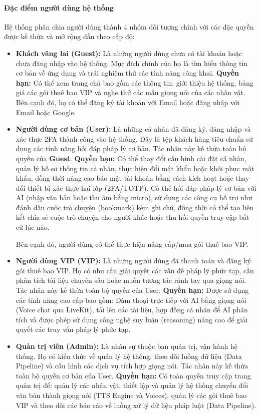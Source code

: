 \paragraph{Đặc điểm người dùng hệ thống}

Hệ thống phân chia người dùng
thành 4 nhóm đối tượng chính
với các đặc quyền được kế thừa
và mở rộng dần theo cấp độ:

\begin{itemize}

\item \textbf{Khách vãng lai (Guest):}
Là những người dùng chưa có tài khoản
hoặc chưa đăng nhập vào hệ thống.
Mục đích chính của họ
là tìm hiểu thông tin cơ bản về ứng dụng
và trải nghiệm thử các tính năng công khai.
\textbf{Quyền hạn:}
Có thể xem trang chủ bao gồm các thông tin:
giới thiệu hệ thống, bảng giá các gói thuê bao VIP
và nghe thử các mẫu giọng nói của các nhân vật.
Bên cạnh đó, họ có thể đăng ký tài khoản với Email
hoặc đăng nhập với Email hoặc Google.

\item \textbf{Người dùng cơ bản (User):}
Là những cá nhân đã đăng ký, đăng nhập
và xác thực 2FA
thành công vào hệ thống.
Đây là tệp khách hàng tiêu chuẩn
sử dụng các tính năng
hỏi đáp pháp lý cơ bản.
Tác nhân này kế thừa toàn bộ quyền của \textbf{Guest}.
\textbf{Quyền hạn:}
Có thể
thay đổi cấu hình cài đặt cá nhân,
quản lý hồ sơ thông tin cá nhân,
thực hiện đổi mật khẩu hoặc khôi phục mật khẩu,
đồng thời nâng cao bảo mật tài khoản bằng cách kích hoạt hoặc thay đổi thiết bị xác thực hai lớp (2FA/TOTP).
Có thể hỏi đáp pháp lý cơ bản với AI (nhập văn bản hoặc thu âm bằng micro),
sử dụng các công cụ hỗ trợ như đánh dấu cuộc trò chuyện (bookmark) kèm ghi chú, đồng thời có thể tạo liên kết chia sẻ cuộc trò chuyện cho người khác hoặc thu hồi quyền truy cập bất cứ lúc nào.

Bên cạnh đó, người dùng có thể thực hiện nâng cấp/mua gói thuê bao VIP.

\item \textbf{Người dùng VIP (VIP):}
Là những người dùng đã thanh toán
và đăng ký gói thuê bao VIP.
Họ có nhu cầu giải quyết
các vấn đề pháp lý phức tạp,
cần phân tích tài liệu chuyên sâu
hoặc muốn tương tác rảnh tay qua giọng nói.
Tác nhân này kế thừa toàn bộ quyền của User.
\textbf{Quyền hạn:}
Được sử dụng các tính năng cao cấp bao gồm:
Đàm thoại trực tiếp với AI bằng giọng nói
(Voice chat qua LiveKit),
tải lên các tài liệu, hợp đồng cá nhân để AI phân tích
và được phép sử dụng công nghệ suy luận (reasoning) nâng cao
để giải quyết các truy vấn pháp lý phức tạp.

\item \textbf{Quản trị viên (Admin):}
Là nhân sự thuộc ban quản trị, vận hành hệ thống.
Họ có kiến thức
về quản lý hệ thống,
theo dõi luồng dữ liệu (Data Pipeline)
và cấu hình các dịch vụ tích hợp giọng nói.
Tác nhân này kế thừa toàn bộ quyền cơ bản của User.
\textbf{Quyền hạn:}
Có toàn quyền truy cập trang quản trị để:
quản lý các nhân vật,
thiết lập và quản lý hệ thống chuyển đổi văn bản thành giọng nói
(TTS Engine và Voices),
quản lý các gói thuê bao VIP
và theo dõi các báo cáo về luồng xử lý dữ liệu pháp luật (Data Pipeline).
\end{itemize}
